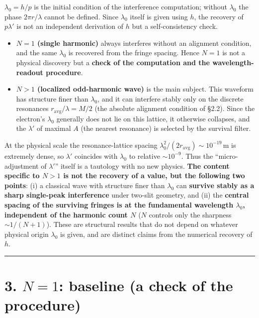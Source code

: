 \documentclass[11pt,a4paper]{article}
\providecommand{\tightlist}{\setlength{\itemsep}{0pt}\setlength{\parskip}{0pt}}
\begin{document}
\(\lambda_0=h/p\) is the initial condition of the interference
computation; without \(\lambda_0\) the phase \(2\pi r/\lambda\) cannot
be defined. Since \(\lambda_0\) itself is given using \(h\), the
recovery of \(p\lambda'\) is not an independent derivation of \(h\) but
a self-consistency check.

\begin{itemize}
\tightlist
\item
  \textbf{\(N=1\) (single harmonic)} always interferes without an
  alignment condition, and the same \(\lambda_0\) is recovered from the
  fringe spacing. Hence \(N=1\) is not a physical discovery but a
  \textbf{check of the computation and the wavelength-readout
  procedure}.
\item
  \textbf{\(N>1\) (localized odd-harmonic wave)} is the main subject.
  This waveform has structure finer than \(\lambda_0\), and it can
  interfere stably only on the discrete resonances
  \(r_{\mathrm{avg}}/\lambda=M/2\) (the absolute alignment condition of
  §2.2). Since the electron's \(\lambda_0\) generally does not lie on
  this lattice, it otherwise collapses, and the \(\lambda'\) of maximal
  \(A\) (the nearest resonance) is selected by the survival filter.
\end{itemize}

At the physical scale the resonance-lattice spacing
\(\lambda_0^2/(2r_{\mathrm{avg}})\sim10^{-19}\,\mathrm{m}\) is extremely
dense, so \(\lambda'\) coincides with \(\lambda_0\) to relative
\(\sim10^{-9}\). Thus the ``micro-adjustment of \(\lambda'\)'' itself is
a tautology with no new physics. \textbf{The content specific to \(N>1\)
is not the recovery of a value, but the following two points}: (i) a
classical wave with structure finer than \(\lambda_0\) can
\textbf{survive stably as a sharp single-peak interference} under
two-slit geometry, and (ii) the \textbf{central spacing of the surviving
fringes is at the fundamental wavelength \(\lambda_0\), independent of
the harmonic count \(N\)} (\(N\) controls only the sharpness
\(\sim1/(N{+}1)\)). These are structural results that do not depend on
whatever physical origin \(\lambda_0\) is given, and are distinct claims
from the numerical recovery of \(h\).

\begin{center}\rule{0.5\linewidth}{0.5pt}\end{center}

\section{\texorpdfstring{3. \(N=1\): baseline (a check of the
procedure)}{3. N=1: baseline (a check of the procedure)}}\label{n1-baseline-a-check-of-the-procedure}
\end{document}
